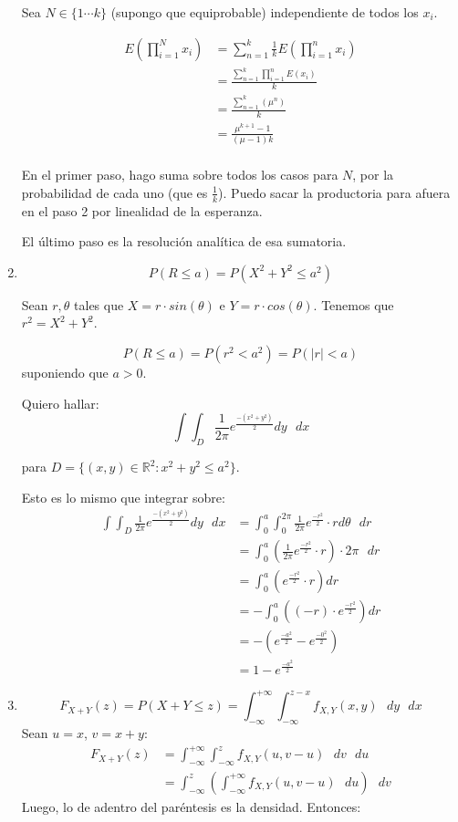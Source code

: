 \begin{enumerate}
		Sea $N \in \{1\cdots k\}$ (supongo que equiprobable) independiente de todos los $x_i$.
		
		\begin{align*}
			E(\prod_{i=1}^N x_i)	& = \sum_{n=1}^k \frac{1}{k}E(\prod_{i=1}^n x_i) \\
									& = \frac{\sum_{n=1}^k \prod_{i=1}^n E(x_i)}{k} \\
									& = \frac{\sum_{n=1}^k (\mu ^n)}{k} \\
									& = \frac{\mu^{k+1} - 1}{(\mu - 1)k} \\
		\end{align*}
		
		En el primer paso, hago suma sobre todos los casos para $N$, por la probabilidad de cada uno (que es $\frac{1}{k}$). Puedo sacar la productoria para afuera en el paso 2 por linealidad de la esperanza.
		
		El último paso es la resolución analítica de esa sumatoria.
		
	\item
		$$P(R \leq a) = P(X^2 + Y^2 \leq a^2)$$
		
		Sean $r, \theta$ tales que $X = r\cdot sin(\theta)$ e $Y = r \cdot cos(\theta)$.
		Tenemos que $r^2 = X^2 + Y^2$.
		
		$$P(R \leq a) = P(r^2 < a^2) = P(|r| < a)$$
		suponiendo que $a > 0$.
		
		Quiero hallar:
		$$\int\int_D \frac{1}{2\pi} e^{\frac{-(x^2 + y^2)}{2}} dy\text{ }dx$$
		
		para $D = \{(x, y) \in \mathbb{R}^2 : x^2 + y^2 \leq a^2\}$.		
		
		Esto es lo mismo que integrar sobre:
		\begin{align*}
			\int\int_D \frac{1}{2\pi} e^{\frac{-(x^2 + y^2)}{2}} dy\text{ }dx
				& = \int_0^a\int_0^{2\pi} \frac{1}{2\pi} e^{\frac{-r^2}{2}} \cdot r d\theta\text{ }dr\\
				& = \int_0^a \left(\frac{1}{2\pi} e^{\frac{-r^2}{2}} \cdot r\right) \cdot 2\pi\text{ }dr \\
				& = \int_0^a (e^{\frac{-r^2}{2}} \cdot r) dr \\
				& = -\int_0^a ((-r)\cdot e^{\frac{-r^2}{2}}) dr \\
				& = -(e^{\frac{-a^2}{2}} -e^{\frac{-0^2}{2}}) \\
				& = 1 - e^{\frac{-a^2}{2}}
		\end{align*}
	
	\item
		$$F_{X+Y}(z) = P(X+Y \leq z) = \int_{-\infty}^{+\infty} \int_{-\infty}^{z-x} f_{X,Y}(x, y)\text{ }dy\text{ }dx$$
		Sean $u=x$, $v=x+y$:
		\begin{align*}
			F_{X+Y}(z)	& = \int_{-\infty}^{+\infty} \int_{-\infty}^{z} f_{X,Y}(u, v-u)\text{ }dv\text{ }du \\
						& = \int_{-\infty}^{z} \left(\int_{-\infty}^{+\infty} f_{X,Y}(u, v-u)\text{ }du\right)\text{ }dv
		\end{align*}
		Luego, lo de adentro del paréntesis es la densidad. Entonces:
		

\end{enumerate}

